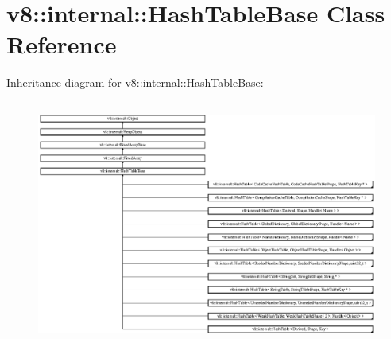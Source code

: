 \hypertarget{classv8_1_1internal_1_1_hash_table_base}{}\section{v8\+:\+:internal\+:\+:Hash\+Table\+Base Class Reference}
\label{classv8_1_1internal_1_1_hash_table_base}
Inheritance diagram for v8\+:\+:internal\+:\+:Hash\+Table\+Base\+:\begin{figure}[H]
\begin{center}
\leavevmode
\includegraphics[height=8.122868cm]{classv8_1_1internal_1_1_hash_table_base}
\end{center}
\end{figure}
